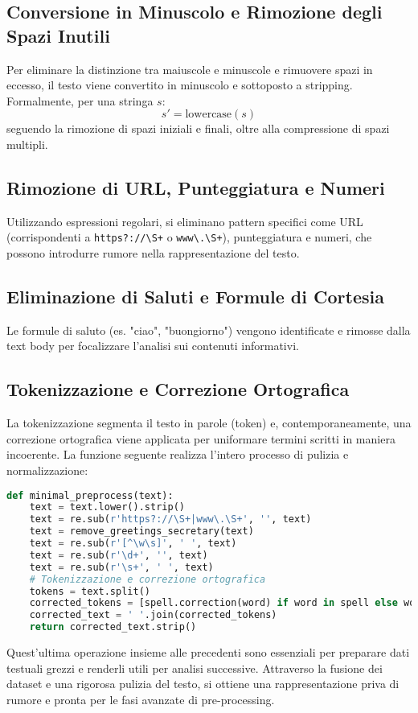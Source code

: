 \subsection{Conversione in Minuscolo e Rimozione degli Spazi Inutili}
Per eliminare la distinzione tra maiuscole e minuscole e rimuovere spazi in eccesso, il testo viene convertito in minuscolo e sottoposto a stripping. Formalmente, per una stringa \( s \):
\[
s' = \text{lowercase}(s)
\]
seguendo la rimozione di spazi iniziali e finali, oltre alla compressione di spazi multipli.

\subsection{Rimozione di URL, Punteggiatura e Numeri}
Utilizzando espressioni regolari, si eliminano pattern specifici come URL (corrispondenti a \verb|https?://\S+| o \verb|www\.\S+|), punteggiatura e numeri, che possono introdurre rumore nella rappresentazione del testo.

\subsection{Eliminazione di Saluti e Formule di Cortesia}
Le formule di saluto (es. "ciao", "buongiorno") vengono identificate e rimosse dalla text body per focalizzare l'analisi sui contenuti informativi.

\subsection{Tokenizzazione e Correzione Ortografica}
La tokenizzazione segmenta il testo in parole (token) e, contemporaneamente, una correzione ortografica viene applicata per uniformare termini scritti in maniera incoerente. La funzione seguente realizza l'intero processo di pulizia e normalizzazione:

\begin{lstlisting}[language=Python,caption={Funzione minimal\_preprocess}]
def minimal_preprocess(text):
    text = text.lower().strip()
    text = re.sub(r'https?://\S+|www\.\S+', '', text)
    text = remove_greetings_secretary(text)
    text = re.sub(r'[^\w\s]', ' ', text)
    text = re.sub(r'\d+', '', text)
    text = re.sub(r'\s+', ' ', text)
    # Tokenizzazione e correzione ortografica
    tokens = text.split()
    corrected_tokens = [spell.correction(word) if word in spell else word for word in tokens]
    corrected_text = ' '.join(corrected_tokens)
    return corrected_text.strip()
\end{lstlisting}

Quest'ultima operazione insieme alle precedenti sono essenziali per preparare dati testuali grezzi e renderli utili per analisi successive. Attraverso la fusione dei dataset e una rigorosa pulizia del testo, si ottiene una rappresentazione priva di rumore e pronta per le fasi avanzate di pre-processing.